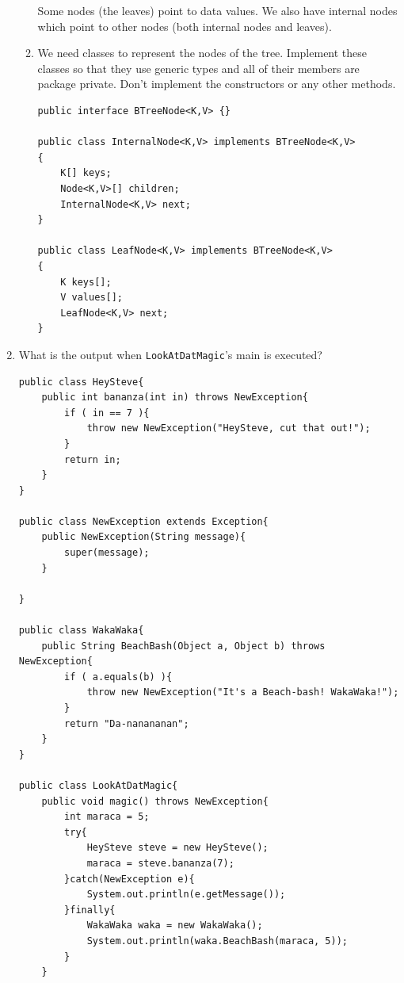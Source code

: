 \documentclass[11pt]{article}
\newenvironment{answer}{\large\lstset{basicstyle=\tiny\ttfamily}\color{white}}{}
\newenvironment{answer}{\large\lstset{basicstyle=\large\ttfamily}\color{red}}{}
\begin{document}
\begin{enumerate}
\begin{enumerate}
        \begin{answer}
        Some nodes (the leaves) point to data values. We also have internal
        nodes which point to other nodes (both internal nodes and leaves).
        \end{answer}
		\vspace{0.125in}

    \item We need classes to represent the nodes of the tree. Implement these
    classes so that they use generic types and all of their members are package
    private. Don't implement the constructors or any other methods.

\begin{answer}
\begin{lstlisting}
public interface BTreeNode<K,V> {}

public class InternalNode<K,V> implements BTreeNode<K,V>
{
    K[] keys;
    Node<K,V>[] children;
    InternalNode<K,V> next;
}

public class LeafNode<K,V> implements BTreeNode<K,V>
{
    K keys[];
    V values[];
    LeafNode<K,V> next;
}
\end{lstlisting}
\end{answer}

    \end{enumerate}


\newpage
\item What is the output when \texttt{LookAtDatMagic}'s main is executed?
\begin{lstlisting}
public class HeySteve{
    public int bananza(int in) throws NewException{
        if ( in == 7 ){
            throw new NewException("HeySteve, cut that out!");
        }
        return in;
    }
}

public class NewException extends Exception{
    public NewException(String message){
        super(message);
    }

}
           
public class WakaWaka{
    public String BeachBash(Object a, Object b) throws NewException{
        if ( a.equals(b) ){
            throw new NewException("It's a Beach-bash! WakaWaka!");
        }
        return "Da-nanananan";
    }
}

public class LookAtDatMagic{
    public void magic() throws NewException{
        int maraca = 5;
        try{
            HeySteve steve = new HeySteve();
            maraca = steve.bananza(7);
        }catch(NewException e){
            System.out.println(e.getMessage());
        }finally{
            WakaWaka waka = new WakaWaka();
            System.out.println(waka.BeachBash(maraca, 5));
        }
    }


\end{lstlisting}
\end{enumerate}
\end{document}
